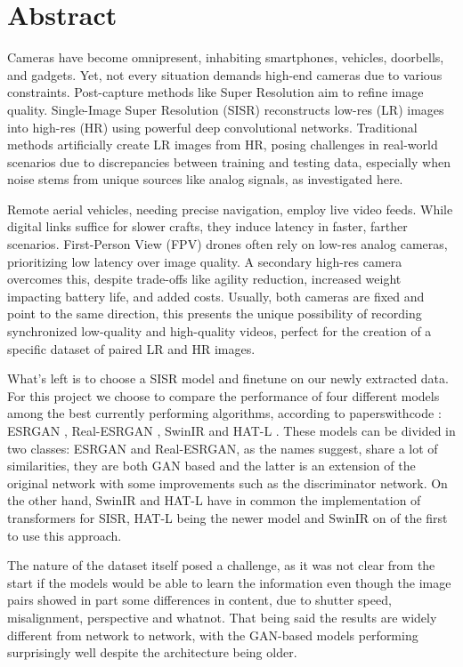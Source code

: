 \chapter*{Abstract}
\label{abstract}

Cameras have become omnipresent, inhabiting smartphones, vehicles, doorbells, and gadgets. Yet, not every situation demands high-end cameras due to various constraints. Post-capture methods like Super Resolution aim to refine image quality. Single-Image Super Resolution (SISR) reconstructs low-res (LR) images into high-res (HR) using powerful deep convolutional networks. Traditional methods artificially create LR images from HR, posing challenges in real-world scenarios due to discrepancies between training and testing data, especially when noise stems from unique sources like analog signals, as investigated here.

Remote aerial vehicles, needing precise navigation, employ live video feeds. While digital links suffice for slower crafts, they induce latency in faster, farther scenarios. First-Person View (FPV) drones often rely on low-res analog cameras, prioritizing low latency over image quality. A secondary high-res camera overcomes this, despite trade-offs like agility reduction, increased weight impacting battery life, and added costs. Usually, both cameras are fixed and point to the same direction, this presents the unique possibility of recording synchronized low-quality and high-quality videos, perfect for the creation of a specific dataset of paired LR and HR images.

What's left is to choose a SISR model and finetune on our newly extracted data. For this project we choose to compare the performance of four different models among the best currently performing algorithms, according to paperswithcode \cite{pwcode}: ESRGAN \cite{wang2018esrgan}, Real-ESRGAN \cite{wang2021realesrgan}, SwinIR \cite{liang2021swinir} and HAT-L \cite{chen2023activating}. These models can be divided in two classes: ESRGAN and Real-ESRGAN, as the names suggest, share a lot of similarities, they are both GAN based and the latter is an extension of the original network with some improvements such as the discriminator network. On the other hand, SwinIR and HAT-L have in common the implementation of transformers for SISR, HAT-L being the newer model and SwinIR on of the first to use this approach.

The nature of the dataset itself posed a challenge, as it was not clear from the start if the models would be able to learn the information even though the image pairs showed in part some differences in content, due to shutter speed, misalignment, perspective and whatnot. That being said the results are widely different from network to network, with the GAN-based models performing surprisingly well despite the architecture being older.

